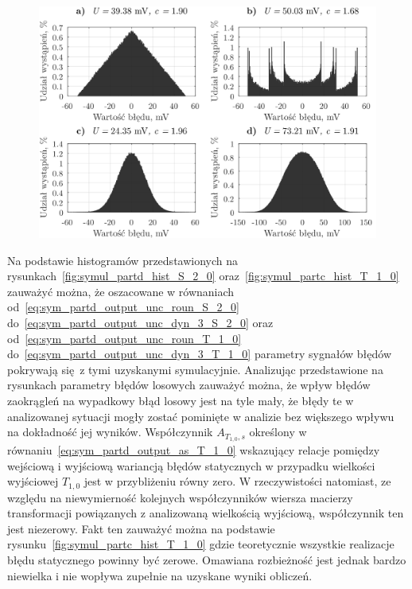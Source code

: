 \begin{figure}[htb!]
\begin{center}
\includegraphics{obrazki/hist_part_S}
\end{center}
\end{figure}

Na podstawie histogramów przedstawionych na rysunkach~\ref{fig:symul_partd_hist_S_2_0} oraz~\ref{fig:symul_partc_hist_T_1_0} zauważyć można, że oszacowane w równaniach od~\eqref{eq:sym_partd_output_unc_roun_S_2_0} do~\eqref{eq:sym_partd_output_unc_dyn_3_S_2_0} oraz od~\eqref{eq:sym_partd_output_unc_roun_T_1_0} do~\eqref{eq:sym_partd_output_unc_dyn_3_T_1_0} parametry sygnałów błędów pokrywają się z tymi uzyskanymi symulacyjnie. Analizując przedstawione na rysunkach parametry błędów losowych zauważyć można, że wpływ błędów zaokrągleń na wypadkowy błąd losowy jest na tyle mały, że błędy te w analizowanej sytuacji mogły zostać pominięte w analizie bez większego wpływu na dokładność jej wyników. Współczynnik $A_{T_{1,0},s} $ określony w równaniu~\eqref{eq:sym_partd_output_as_T_1_0} wskazujący relacje pomiędzy wejściową i wyjściową wariancją błędów statycznych w przypadku wielkości wyjściowej $T_{1,0}$ jest w przybliżeniu równy zero. W rzeczywistości natomiast, ze względu na niewymierność kolejnych współczynników wiersza macierzy transformacji powiązanych z analizowaną wielkością wyjściową, współczynnik ten jest niezerowy. Fakt ten zauważyć można na podstawie rysunku~\ref{fig:symul_partc_hist_T_1_0} gdzie teoretycznie wszystkie realizacje błędu statycznego powinny być zerowe. Omawiana rozbieżność jest jednak bardzo niewielka i nie wopływa zupełnie na uzyskane wyniki obliczeń.

